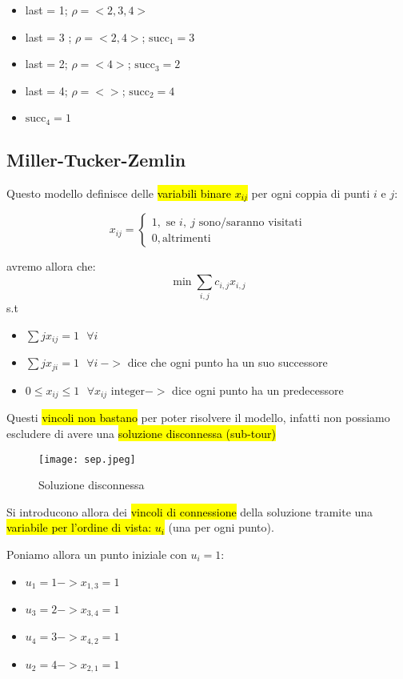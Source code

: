 \begin{itemize}
    \item last = 1; $\rho = <2,3,4>$
    \item last = 3 ; $\rho=<2,4>$; $\text{succ}_1 = 3$
    \item last = 2; $\rho=<4>$; $\text{succ}_3 = 2$
    \item last = 4; $\rho =<>$; $\text{succ}_2 =4$
    \item $\text{succ}_4 = 1$
\end{itemize}


\subsection{Miller-Tucker-Zemlin}

Questo modello definisce delle \hl{variabili binare $x_{ij}$} per ogni coppia di punti $i$ e $j$:

$$ x_{ij} =
\begin{cases} 
    1, \text{ se } i,\ j \text{ sono/saranno visitati} \\ 
    0, \text{altrimenti}
\end{cases}
$$

avremo allora che:
$$\min \sum_{i,j} c_{i,j} x_{i,j}$$
s.t
\begin{itemize}
    \item $\sum{j} x_{ij} = 1\ \ \ \forall i$
    \item $\sum{j} x_{ji} = 1\ \ \ \forall i\ ->$ dice che ogni punto ha un suo successore
    \item $0 \leq x_{ij} \leq 1\ \ \ \forall x_{ij} \text{ integer} ->$ dice ogni punto ha un predecessore
\end{itemize}

Questi \hl{vincoli non bastano} per poter risolvere il modello, infatti non possiamo escludere di avere una \hl{soluzione disconnessa (sub-tour)}


\begin{figure}[H]
\centering
\texttt{[image: sep.jpeg]}
\caption{Soluzione disconnessa} 
\label{sep}
\end{figure}


Si introducono allora dei \hl{vincoli di connessione} della soluzione tramite una \hl{variabile per l'ordine di vista: $u_i$} (una per ogni punto).

Poniamo allora un punto iniziale con $u_i = 1$:

\begin{itemize}
    \item[] $u_1 = 1 -> x_{1,3} = 1$
    \item[] $u_3 = 2 -> x_{3,4} = 1$
    \item[] $u_4 = 3 -> x_{4,2} = 1$
    \item[] $u_2 = 4 -> x_{2,1} = 1$
\end{itemize}

